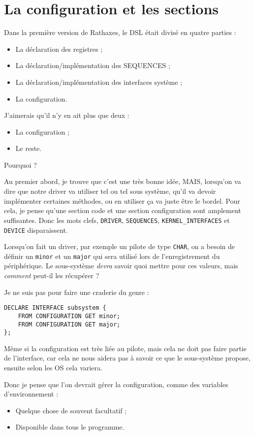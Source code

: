 \documentclass[french]{rtxreport}
\begin{document}
\chapter{La configuration et les sections}

Dans la première version de Rathaxes, le DSL était divisé en quatre parties : 
\begin{itemize}
	\item La déclaration des registres ; 
	\item La déclaration/implémentation des SEQUENCES ; 
	\item La déclaration/implémentation des interfaces système ;
	\item La configuration. 
\end{itemize}

J’aimerais qu’il n’y en ait plus que deux : 
\begin{itemize}
	\item La configuration ; 
	\item Le reste. 
\end{itemize}

Pourquoi ? 

Au premier abord, je trouve que c’est une très bonne idée, MAIS, lorsqu’on va dire que notre driver va utiliser tel ou tel sous système, qu’il va devoir implémenter certaines méthodes, ou en utiliser ça va juste être le bordel. Pour cela, je pense qu’une section code et une section configuration sont amplement suffisantes. Donc les mots clefs, \texttt{DRIVER}, \texttt{SEQUENCES}, \texttt{KERNEL\_INTERFACES} et \texttt{DEVICE} disparaissent. 

Lorsqu’on fait un driver, par exemple un pilote de type \texttt{CHAR}, on a besoin de définir un \texttt{minor} et un \texttt{major} qui sera utilisé lors de l’enregistrement du périphérique. Le sous-système \emph{devra} savoir quoi mettre pour ces valeurs, mais \emph{comment} peut-il les récupérer ?

Je ne suis pas pour faire une craderie du genre :

\begin{lstlisting}
DECLARE INTERFACE subsystem {
	FROM CONFIGURATION GET minor;
	FROM CONFIGURATION GET major;
};
\end{lstlisting}
Même si la configuration est très liée au pilote, mais cela ne doit pas faire partie de l’interface, car cela ne nous aidera pas à savoir ce que le sous-système propose, ensuite selon les OS cela variera.

Donc je pense que l’on devrait gérer la configuration, comme des variables d’environnement :
\begin{itemize}
	\item Quelque chose de souvent facultatif ; 
	\item Disponible dans tous le programme.
\end{itemize}
\end{document}
